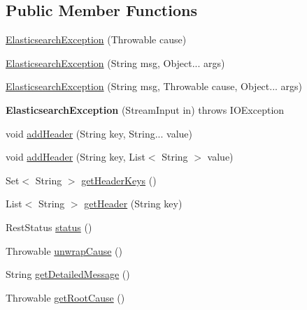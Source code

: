 \subsection*{Public Member Functions}
\begin{DoxyCompactItemize}
\item 
\hyperlink{classorg_1_1elasticsearch_1_1_elasticsearch_exception_ae6a6289693dfd265ad9167eb30918c3f}{Elasticsearch\+Exception} (Throwable cause)
\item 
\hyperlink{classorg_1_1elasticsearch_1_1_elasticsearch_exception_ae9bdc2247b5d219e66764dcf8ef4e7c6}{Elasticsearch\+Exception} (String msg, Object... args)
\item 
\hyperlink{classorg_1_1elasticsearch_1_1_elasticsearch_exception_a2202d9407b99327ee6af4af27d92f913}{Elasticsearch\+Exception} (String msg, Throwable cause, Object... args)
\item 
\hypertarget{classorg_1_1elasticsearch_1_1_elasticsearch_exception_a3c2822e315258b450247dc5f498a9638}{}\label{classorg_1_1elasticsearch_1_1_elasticsearch_exception_a3c2822e315258b450247dc5f498a9638} 
{\bfseries Elasticsearch\+Exception} (Stream\+Input in)  throws I\+O\+Exception 
\item 
void \hyperlink{classorg_1_1elasticsearch_1_1_elasticsearch_exception_a5810e3d73a8f132c0967e6a57732bc23}{add\+Header} (String key, String... value)
\item 
void \hyperlink{classorg_1_1elasticsearch_1_1_elasticsearch_exception_a2af671e59ace44acbfd37047341072ee}{add\+Header} (String key, List$<$ String $>$ value)
\item 
Set$<$ String $>$ \hyperlink{classorg_1_1elasticsearch_1_1_elasticsearch_exception_ac6b0fc84271df098d018e69db92058a4}{get\+Header\+Keys} ()
\item 
List$<$ String $>$ \hyperlink{classorg_1_1elasticsearch_1_1_elasticsearch_exception_ac5c7fe2597ce0b363d433503b23a1181}{get\+Header} (String key)
\item 
Rest\+Status \hyperlink{classorg_1_1elasticsearch_1_1_elasticsearch_exception_ad9c404eb416b323496900d737183875e}{status} ()
\item 
Throwable \hyperlink{classorg_1_1elasticsearch_1_1_elasticsearch_exception_afc4c4c4644fddfd06805fa19e65459fc}{unwrap\+Cause} ()
\item 
String \hyperlink{classorg_1_1elasticsearch_1_1_elasticsearch_exception_a4c3811c41b21d6c6dc7d7f5d97042e95}{get\+Detailed\+Message} ()
\item 
Throwable \hyperlink{classorg_1_1elasticsearch_1_1_elasticsearch_exception_a1d174a2312e18c883196ec07c87c2f50}{get\+Root\+Cause} ()

\end{DoxyCompactItemize}
